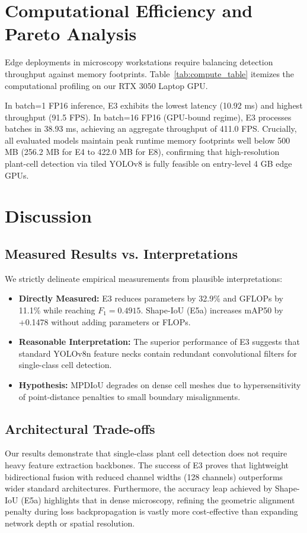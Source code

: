 \documentclass[conference]{IEEEtran}
\begin{document}
\section{Computational Efficiency and Pareto Analysis}
Edge deployments in microscopy workstations require balancing detection throughput against memory footprints. Table~\ref{tab:compute_table} itemizes the computational profiling on our RTX 3050 Laptop GPU.

In batch=1 FP16 inference, E3 exhibits the lowest latency (10.92 ms) and highest throughput (91.5 FPS). In batch=16 FP16 (GPU-bound regime), E3 processes batches in 38.93 ms, achieving an aggregate throughput of 411.0 FPS. Crucially, all evaluated models maintain peak runtime memory footprints well below 500 MB (256.2 MB for E4 to 422.0 MB for E8), confirming that high-resolution plant-cell detection via tiled YOLOv8 is fully feasible on entry-level 4 GB edge GPUs.

\section{Discussion}
\subsection{Measured Results vs. Interpretations}
We strictly delineate empirical measurements from plausible interpretations:
\begin{itemize}
    \item \textbf{Directly Measured:} E3 reduces parameters by 32.9\% and GFLOPs by 11.1\% while reaching $F_1=0.4915$. Shape-IoU (E5a) increases mAP50 by +0.1478 without adding parameters or FLOPs.
    \item \textbf{Reasonable Interpretation:} The superior performance of E3 suggests that standard YOLOv8n feature necks contain redundant convolutional filters for single-class cell detection.
    \item \textbf{Hypothesis:} MPDIoU degrades on dense cell meshes due to hypersensitivity of point-distance penalties to small boundary misalignments.
\end{itemize}

\subsection{Architectural Trade-offs}
Our results demonstrate that single-class plant cell detection does not require heavy feature extraction backbones. The success of E3 proves that lightweight bidirectional fusion with reduced channel widths (128 channels) outperforms wider standard architectures. Furthermore, the accuracy leap achieved by Shape-IoU (E5a) highlights that in dense microscopy, refining the geometric alignment penalty during loss backpropagation is vastly more cost-effective than expanding network depth or spatial resolution.
\end{document}
